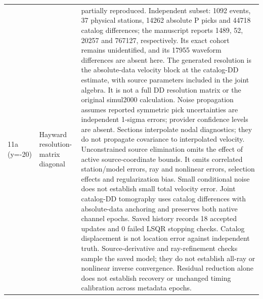 \begin{longtable}{>{\raggedright\arraybackslash}p{}>{\raggedright\arraybackslash}p{}>{\raggedright\arraybackslash}p{}}
11a (y=-20) & Hayward resolution-matrix diagonal & partially reproduced. Independent subset: 1092 events, 37 physical stations, 14262 absolute P picks and 44718 catalog differences; the manuscript reports 1489, 52, 20257 and 767127, respectively. Its exact cohort remains unidentified, and its 17955 waveform differences are absent here. The generated resolution is the absolute-data velocity block at the catalog-DD estimate, with source parameters included in the joint algebra. It is not a full DD resolution matrix or the original simul2000 calculation. Noise propagation assumes reported symmetric pick uncertainties are independent 1-sigma errors; provider confidence levels are absent. Sections interpolate nodal diagnostics; they do not propagate covariance to interpolated velocity. Unconstrained source elimination omits the effect of active source-coordinate bounds. It omits correlated station/model errors, ray and nonlinear errors, selection effects and regularization bias. Small conditional noise does not establish small total velocity error. Joint catalog-DD tomography uses catalog differences with absolute-data anchoring and preserves both native channel epochs. Saved history records 18 accepted updates and 0 failed LSQR stopping checks. Catalog displacement is not location error against independent truth. Source-derivative and ray-refinement checks sample the saved model; they do not establish all-ray or nonlinear inverse convergence. Residual reduction alone does not establish recovery or unchanged timing calibration across metadata epochs.\\

\end{longtable}
